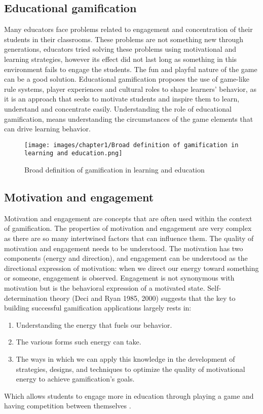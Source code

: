 \documentclass[../main.tex]{subfiles}
\begin{document}
\subsection{Educational gamification}
Many educators face problems related to engagement and concentration of their students in their classrooms. These problems are not something new through generations, educators tried solving these problems using motivational and learning  strategies, however its effect did not last long as something in this environment fails to engage the students. The fun and playful nature of the game can be a good solution. 
Educational gamification proposes the use of game-like rule systems, player experiences and cultural roles to shape learners’ behavior, as it is an approach that seeks to motivate students and inspire them to learn, understand and concentrate easily. Understanding the role of educational gamification, means understanding the circumstances of the game elements that can drive learning behavior.
\begin{figure}[ht]
\centering
\texttt{[image: images/chapter1/Broad definition of gamification in learning and education.png]}
\caption{Broad definition of gamification in learning and education}
\label{fig:Broad definition of gamification in learning and education}
\end{figure}

\subsection{Motivation and engagement}
Motivation and engagement are concepts that are often used within the context of gamification. The properties of motivation and engagement are very complex as there are so many intertwined factors that can influence them. The quality of motivation and engagement needs to be understood. The motivation has two components (energy and direction), and engagement can be understood as the directional expression of motivation: when we direct our energy toward something or someone, engagement is observed. Engagement is not synonymous with motivation but is the behavioral expression of a motivated state.
Self-determination theory (Deci and Ryan 1985, 2000) \cite{8} suggests that the key to building successful gamification applications largely rests in:
\begin{enumerate}
    \item Understanding the energy that fuels our behavior.
    \item The various forms such energy can take.
    \item The ways in which we can apply this knowledge in the development of strategies, designs, and techniques to optimize the quality of motivational energy to achieve gamification’s goals.
\end{enumerate}
Which allows students to engage more in education through playing a game and having competition between themselves \cite{9}.
\end{document}
